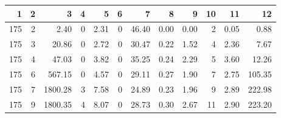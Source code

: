 \begin{tabular}{rrrrrrrrrrrr}
\toprule
1 & 2 & 3 & 4 & 5 & 6 & 7 & 8 & 9 & 10 & 11 & 12 \\
\midrule
175 & 2 & 2.40 & 0 & 2.31 & 0 & 46.40 & 0.00 & 0.00 & 2 & 0.05 & 0.88 \\
175 & 3 & 20.86 & 0 & 2.72 & 0 & 30.47 & 0.22 & 1.52 & 4 & 2.36 & 7.67 \\
175 & 4 & 47.03 & 0 & 3.82 & 0 & 35.25 & 0.24 & 2.29 & 5 & 3.60 & 12.26 \\
175 & 6 & 567.15 & 0 & 4.57 & 0 & 29.11 & 0.27 & 1.90 & 7 & 2.75 & 105.35 \\
175 & 7 & 1800.28 & 3 & 7.58 & 0 & 24.89 & 0.23 & 1.96 & 9 & 2.89 & 222.98 \\
175 & 9 & 1800.35 & 4 & 8.07 & 0 & 28.73 & 0.30 & 2.67 & 11 & 2.90 & 223.20 \\
\bottomrule
\end{tabular}
